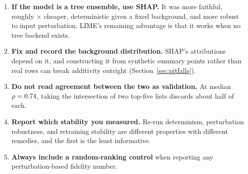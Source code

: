 \begin{enumerate}
  \item \textbf{If the model is a tree ensemble, use SHAP.} It was more faithful,
    roughly \SpeedFactor{}$\times$ cheaper, deterministic given a fixed background, and
    more robust to input perturbation. LIME's remaining advantage is that it works when
    no tree backend exists.
  \item \textbf{Fix and record the background distribution.} SHAP's attributions depend
    on it, and constructing it from synthetic summary points rather than real rows can
    break additivity outright (Section~\ref{sec:pitfalls}).
  \item \textbf{Do not read agreement between the two as validation.} At median
    $\rho = 0.74{}$, taking the intersection of two top-five lists discards about
    half of each.
  \item \textbf{Report which stability you measured.} Re-run determinism, perturbation
    robustness, and retraining stability are different properties with different
    remedies, and the first is the least informative.
  \item \textbf{Always include a random-ranking control} when reporting any
    perturbation-based fidelity number.
\end{enumerate}
